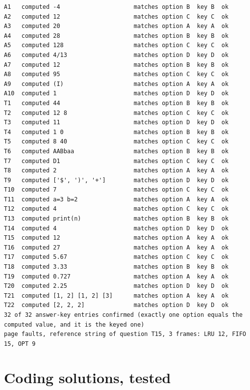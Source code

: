 \documentclass[10pt,a4paper,openany,oneside]{report}
\newcommand{\prio}[1]{\texorpdfstring{\ifcase#1\or{\color{gold}\ding{72}}\or{\color{gold}\ding{72}\ding{72}}\or{\color{gold}\ding{72}\ding{72}\ding{72}}\fi}{}}
\begin{document}
\begin{lstlisting}[style=out,basicstyle=\ttfamily\fontsize{7.2}{8.6}\selectfont,title={oa\_check.py: output}]
A1   computed -4                     matches option B  key B  ok
A2   computed 12                     matches option C  key C  ok
A3   computed 20                     matches option A  key A  ok
A4   computed 28                     matches option B  key B  ok
A5   computed 128                    matches option C  key C  ok
A6   computed 4/13                   matches option D  key D  ok
A7   computed 12                     matches option B  key B  ok
A8   computed 95                     matches option C  key C  ok
A9   computed (I)                    matches option A  key A  ok
A10  computed 1                      matches option D  key D  ok
T1   computed 44                     matches option B  key B  ok
T2   computed 12 8                   matches option C  key C  ok
T3   computed 11                     matches option D  key D  ok
T4   computed 1 0                    matches option B  key B  ok
T5   computed 8 40                   matches option C  key C  ok
T6   computed AABbaa                 matches option B  key B  ok
T7   computed D1                     matches option C  key C  ok
T8   computed 2                      matches option A  key A  ok
T9   computed ['$', ')', '+']        matches option D  key D  ok
T10  computed 7                      matches option C  key C  ok
T11  computed a=3 b=2                matches option A  key A  ok
T12  computed 4                      matches option C  key C  ok
T13  computed print(n)               matches option B  key B  ok
T14  computed 4                      matches option D  key D  ok
T15  computed 12                     matches option A  key A  ok
T16  computed 27                     matches option A  key A  ok
T17  computed 5.67                   matches option C  key C  ok
T18  computed 3.33                   matches option B  key B  ok
T19  computed 0.727                  matches option A  key A  ok
T20  computed 2.25                   matches option D  key D  ok
T21  computed [1, 2] [1, 2] [3]      matches option A  key A  ok
T22  computed [2, 2, 2]              matches option D  key D  ok
32 of 32 answer-key entries confirmed (exactly one option equals the computed value, and it is the keyed one)
page faults, reference string of question T15, 3 frames: LRU 12, FIFO 15, OPT 9
\end{lstlisting}

\section{Coding solutions, tested \prio{3}}
\end{document}

